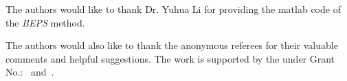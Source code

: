 \documentclass[sigconf]{acmart}
\begin{document}
\begin{acks}

  The authors would like to thank Dr. Yuhua Li for providing the
  matlab code of the \textit{BEPS} method.

  The authors would also like to thank the anonymous referees for
  their valuable comments and helpful suggestions. The work is
  supported by the  under Grant
  No.:~
  and~.

\end{acks}


 
\end{document}
